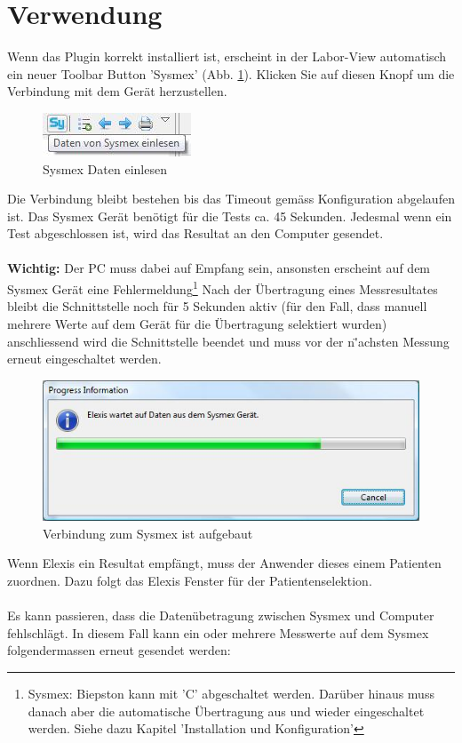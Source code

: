 \documentclass[a4paper]{scrartcl}
\begin{document}
\section{Verwendung}
Wenn das Plugin korrekt installiert ist, erscheint in der Labor-View automatisch ein neuer Toolbar Button 'Sysmex' (Abb. \ref{fig:toolbarbutton}). Klicken Sie auf diesen Knopf um die Verbindung mit dem Ger\"at herzustellen. 
\begin{figure}[h]
    \includegraphics{toolbarbutton}
    \caption{Sysmex Daten einlesen}
    \label{fig:toolbarbutton}
\end{figure}
Die Verbindung bleibt bestehen bis das Timeout gem\"ass Konfiguration abgelaufen ist. Das Sysmex Ger\"at ben\"otigt f\"ur die Tests ca. 45 Sekunden. Jedesmal wenn ein Test abgeschlossen ist, wird das Resultat an den Computer gesendet.\\
\\
\textbf{Wichtig:} Der PC muss dabei auf Empfang sein, ansonsten erscheint auf dem Sysmex Ger\"at eine Fehlermeldung\footnote{Sysmex: Biepston kann mit 'C' abgeschaltet werden. Dar\"uber hinaus muss danach aber die automatische \"Ubertragung aus und wieder eingeschaltet werden. Siehe dazu Kapitel 'Installation und Konfiguration'}
Nach der \"Ubertragung eines Messresultates bleibt die Schnittstelle noch f\"ur 5 Sekunden aktiv (f\"ur den Fall, dass manuell mehrere Werte auf dem Ger\"at f\"ur die \"Ubertragung selektiert wurden) anschliessend wird die Schnittstelle beendet und muss vor der n\"'achsten Messung erneut eingeschaltet werden.
\begin{figure}[h]
    \includegraphics{connected}
    \caption{Verbindung zum Sysmex ist aufgebaut}
    \label{fig:connected}
\end{figure}
Wenn Elexis ein Resultat empf\"angt, muss der Anwender dieses einem Patienten zuordnen. Dazu folgt das Elexis Fenster f\"ur der Patientenselektion.\\
\\
Es kann passieren, dass die Daten\"ubetragung zwischen Sysmex und Computer fehlschl\"agt. In diesem Fall kann ein oder mehrere Messwerte auf dem Sysmex folgendermassen erneut gesendet werden:\\
\end{document}
